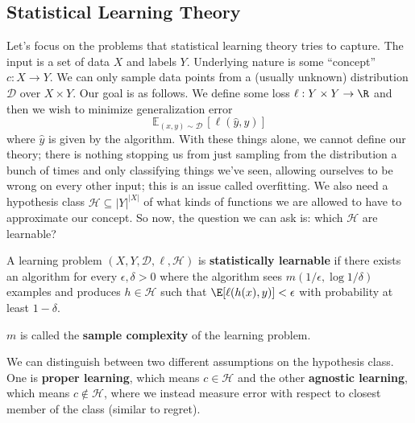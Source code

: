 \subsection{Statistical Learning Theory}
Let's focus on the problems that statistical learning theory tries to capture.
The input is a set of data $X$ and labels $Y$.
Underlying nature is some ``concept'' $c: X \to Y$.
We can only sample data points from a (usually unknown) distribution $\mathcal{D}$ over $X \times Y$.
Our goal is as follows. We define some loss $\ell: Y \times Y \to \R$ and then we wish to minimize
generalization error
\[ \mathbb{E}_{(x, y) \sim \mathcal{D}} \,[\ell(\hat{y}, y)]\]
where $\hat{y}$ is given by the algorithm. 
With these things alone, we cannot define our theory; there is nothing stopping us from just sampling
from the distribution a bunch of times and only classifying things we've seen, allowing ourselves to be wrong 
on every other input; this is an issue called overfitting.
We also need a hypothesis class $\mathcal{H} \subseteq |Y|^{|X|}$
of what kinds of functions we are allowed to have to approximate our concept.
So now, the question we can ask is: which $\mathcal{H}$ are learnable?
\begin{definition}
    A learning problem $(X, Y, \mathcal{D}, \ell, \mathcal{H})$ is
    \textbf{statistically learnable} if there exists an algorithm
    for every $\epsilon, \delta > 0$ where the algorithm
    sees $m(1/\epsilon, \log 1/\delta)$ examples
    and produces $h \in \mathcal{H}$
    such that $\E[\ell(h(x), y)] < \epsilon$ with probability at least $1 - \delta$.

    $m$ is called the \textbf{sample complexity} of the learning problem.
\end{definition}
We can distinguish between two different assumptions on the hypothesis class.
One is \textbf{proper learning}, which means $c \in \mathcal{H}$
and the other \textbf{agnostic learning}, which means $c \notin \mathcal{H}$,
where we instead measure error with respect to closest member of the class (similar to regret).